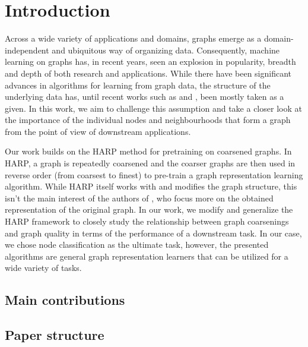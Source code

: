 \section{Introduction}
Across a wide variety of applications and domains, graphs emerge as a domain-independent and ubiquitous way of organizing data. Consequently, machine learning on graphs has, in recent years, seen an explosion in popularity, breadth and depth of both research and applications. While there have been significant advances in algorithms for learning from graph data, the structure of the underlying data has, until recent works such as \cite{topping_understanding_2021} and \cite{velickovic_geometric_2021}, been mostly taken as a given. In this work, we aim to challenge this assumption and take a closer look at the importance of the individual nodes and neighbourhoods that form a graph from the point of view of downstream applications.

Our work builds on the HARP \cite{chen_harp_2018} method for pretraining on coarsened graphs. In HARP, a graph is repeatedly coarsened and the coarser graphs are then used in reverse order (from coarsest to finest) to pre-train a graph representation learning algorithm. While HARP itself works with and modifies the graph structure, this isn't the main interest of the authors of \cite{chen_harp_2018}, who focus more on the obtained representation of the original graph. In our work, we modify and generalize the HARP framework to closely study the relationship between graph coarsenings and graph quality in terms of the performance of a downstream task. In our case, we chose node classification as the ultimate task, however, the presented algorithms are general graph representation learners that can be utilized for a wide variety of tasks.

\subsection{Main contributions}

\subsection{Paper structure}
